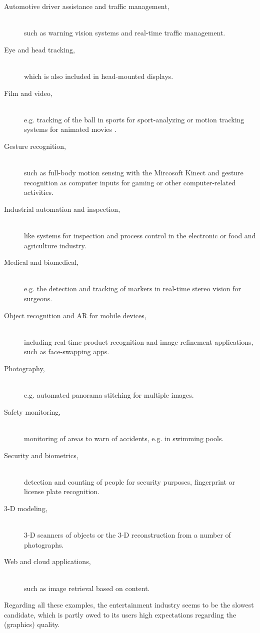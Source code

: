 \begin{description}
\item [Automotive driver assistance and traffic management,]\hfill \\ such as warning vision systems and real-time traffic management.
\item [Eye and head tracking,]\hfill \\ which is also included in head-mounted displays.
\item [Film and video,]\hfill \\ e.g. tracking of the ball in sports for sport-analyzing or motion tracking systems for animated movies .
\item [Gesture recognition,]\hfill \\ such as full-body motion sensing with the Mircosoft Kinect and gesture recognition as computer inputs for gaming or other computer-related activities.
\item [Industrial automation and inspection,]\hfill \\ like systems for inspection and process control in the electronic or food and agriculture industry. 
\item [Medical and biomedical,]\hfill \\ e.g. the detection and tracking of markers in real-time stereo vision for surgeons.
\item [Object recognition and AR for mobile devices,]\hfill \\ including real-time product recognition and image refinement applications, such as face-swapping apps.
\item [Photography,]\hfill \\ e.g. automated panorama stitching for multiple images.
\item [Safety monitoring,]\hfill \\ monitoring of areas to warn of accidents, e.g. in swimming pools.
\item [Security and biometrics,]\hfill \\ detection and counting of people for security purposes, fingerprint or license plate recognition.
\item [3-D modeling,]\hfill \\ 3-D scanners of objects or the 3-D reconstruction from a number of photographs. 
\item [Web and cloud applications,]\hfill \\ such as image retrieval based on content. 
\end{description}

Regarding all these examples, the entertainment industry seems to be the slowest candidate, which is partly owed to its users high expectations regarding the (graphics) quality. 
